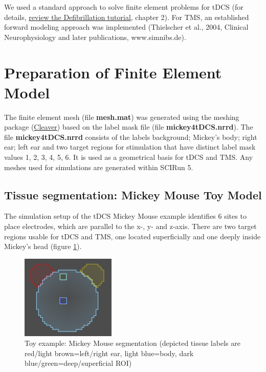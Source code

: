 \documentclass[fleqn,11pt,openany]{book}
\begin{document}
We used a standard approach to solve finite element problems for tDCS (for details, 
\href{http://www.sci.utah.edu/devbuilds/scirun_docs/DefibrillationTutorial.pdf}{review the Defibrillation tutorial}, chapter 2).
For TMS, an established forward modeling approach was implemented (Thielscher et al., 2004, Clinical Neurophysiology and later publications, www.simnibs.de).

\section{Preparation of Finite Element Model}

The finite element mesh (file \textbf{mesh.mat}) was generated using the meshing package
(\href{http://www.sci.utah.edu/cibc-software/cleaver-cibc.html}{Cleaver}) based on the label mask file (file \textbf{mickey4tDCS.nrrd}).
The file \textbf{mickey4tDCS.nrrd} consists of the labels background; Mickey's body; right ear; left ear and two target regions for stimulation that have distinct label mask values 1, 2, 3, 4, 5, 6.
It is used as a geometrical basis for tDCS and TMS. Any meshes used for simulations are generated within SCIRun 5.

\subsection{Tissue segmentation: Mickey Mouse Toy Model}
The simulation setup of the tDCS Mickey Mouse example identifies 6 sites to place electrodes, which are parallel to the x-, y- and z-axis.
There are two target regions usable for tDCS and TMS, one located superficially and one deeply inside Mickey's head (figure \ref{fig:sim_setting}).

\begin{figure}[!h]
\centering
\includegraphics[width=0.4\textwidth]{BrainStimulation_figures/mickey_mouse_seg.png}
\caption{ Toy example: Mickey Mouse segmentation (depicted tissue labels are red/light brown=left/right ear, light blue=body, dark blue/green=deep/superficial ROI) }
\label{fig:sim_setting}
\end{figure}
\end{document}
